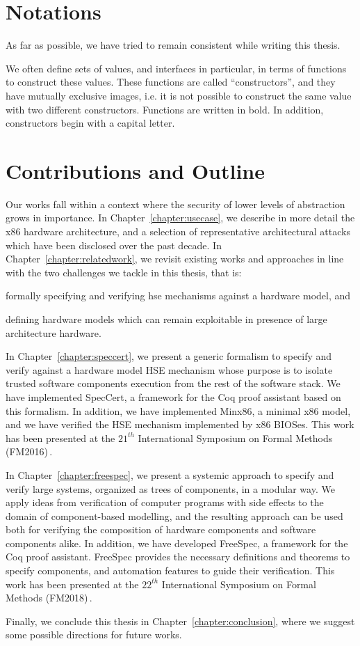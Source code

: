 \section{Notations}

As far as possible, we have tried to remain consistent while writing this
thesis.

We often define sets of values, and interfaces in particular, in terms of
functions to construct these values.
%
These functions are called ``constructors'', and they have mutually exclusive
images, i.e. it is not possible to construct the same value with two different
constructors.
%
Functions are written in bold.
%
In addition, constructors begin with a capital letter.

\section{Contributions and Outline}

Our works fall within a context where the security of lower levels of
abstraction grows in importance.
%
In Chapter~\ref{chapter:usecase}, we describe in more detail the x86 hardware
architecture, and a selection of representative architectural attacks which have
been disclosed over the past decade.
%
In Chapter~\ref{chapter:relatedwork}, we revisit existing works and approaches
in line with the two challenges we tackle in this thesis, that is:
%
\begin{inparaenum}[(1)]
\item formally specifying and verifying \ac{hse} mechanisms against a hardware
  model, and
%
\item defining hardware models which can remain exploitable in presence of large
  architecture hardware.
\end{inparaenum}

In Chapter~\ref{chapter:speccert}, we present a generic formalism to specify and
verify against a hardware model HSE mechanism whose purpose is to isolate
trusted software components execution from the rest of the software stack.
%
We have implemented SpecCert, a framework for the Coq proof assistant based on
this formalism. In addition, we have implemented {\sc Minx86}, a minimal x86
model, and we have verified the HSE mechanism implemented by x86 BIOSes.
%
This work has been presented at the $21^{th}$ International Symposium on Formal
Methods (FM2016)\,\cite{letan2016speccert}.

In Chapter~\ref{chapter:freespec}, we present a systemic approach to specify and
verify large systems, organized as trees of components, in a modular way.
%
We apply ideas from verification of computer programs with side effects to the
domain of component-based modelling, and the resulting approach can be used both
for verifying the composition of hardware components and software components
alike.
%
In addition, we have developed FreeSpec, a framework for the Coq proof
assistant.
%
FreeSpec provides the necessary definitions and theorems to specify components,
and automation features to guide their verification.
%
This work has been presented at the $22^{th}$ International Symposium on Formal
Methods (FM2018)\,\cite{letan2018freespec}.

Finally, we conclude this thesis in Chapter~\ref{chapter:conclusion}, where we
suggest some possible directions for future works.
